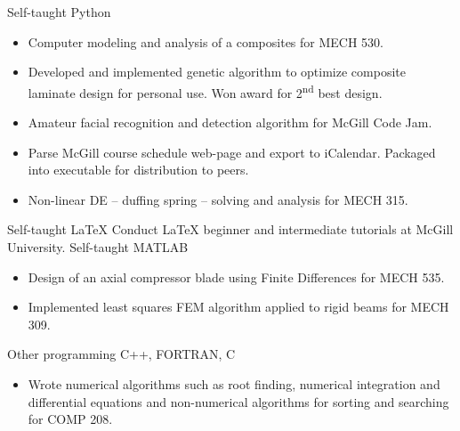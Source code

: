 \begin{entrylist}
\entry
{Self-taught}
{Python}
{}
{\vspace{-\baselineskip}
\begin{itemize}[leftmargin=*]
\item Computer modeling and analysis of a composites for MECH 530.
\item Developed and implemented genetic algorithm to optimize composite laminate design for personal use. Won award for 2\textsuperscript{nd} best design. 
\item Amateur facial recognition and detection algorithm for McGill Code Jam. 
\item Parse McGill course schedule web-page and export to iCalendar. Packaged into executable for distribution to peers.
\item Non-linear DE -- duffing spring -- solving and analysis for MECH 315.
\end{itemize}} 
\entry
{Self-taught}
{LaTeX}
{%
}
{Conduct \LaTeX{} beginner and intermediate tutorials at McGill University. 
}
\entry
{Self-taught}
{MATLAB}
{}
{\vspace{-\baselineskip}
\begin{itemize}[leftmargin=*]
\item Design of an axial compressor blade using Finite Differences for MECH 535.
\item Implemented least squares FEM algorithm applied to rigid beams for MECH 309.
\end{itemize}}
\entry
{}
{Other programming}
{C++, FORTRAN, C}
{\vspace{-\baselineskip}
\begin{itemize}[leftmargin=*]
\item Wrote numerical algorithms such as root finding, numerical integration and differential equations and non-numerical algorithms for sorting and searching for COMP 208. 
\end{itemize}}

\end{entrylist}




